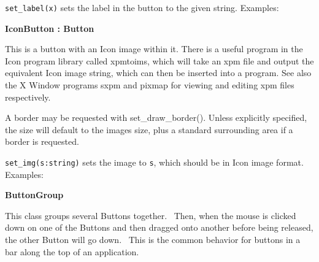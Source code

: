 \texttt{set\_label(x)} sets the label in the button to the given string.
Examples:


{\ttfamily\bfseries
{}IconButton : Button}

This is a button with an Icon image within it. There is a useful program
in the Icon program library called xpmtoims, which will take an xpm
file and output the equivalent Icon image string, which can then be
inserted into a program. See also the X Window programs sxpm and pixmap
for viewing and editing xpm files respectively.

A border may be requested with set\_draw\_border(). Unless explicitly
specified, the size will default to the image{\textquotesingle}s size,
plus a standard surrounding area if a border is requested.

\texttt{set\_img(s:string)} sets the image to \texttt{s}, which should
be in Icon image format. Examples:


{\ttfamily\bfseries
{}ButtonGroup}

This class groups several Buttons together. \ Then, when the mouse is
clicked down on one of the Buttons and then dragged onto another before
being released, the other Button will go
{\textquotedbl}down{\textquotedbl}. \ This is the common behavior for
buttons in a bar along the top of an application.

